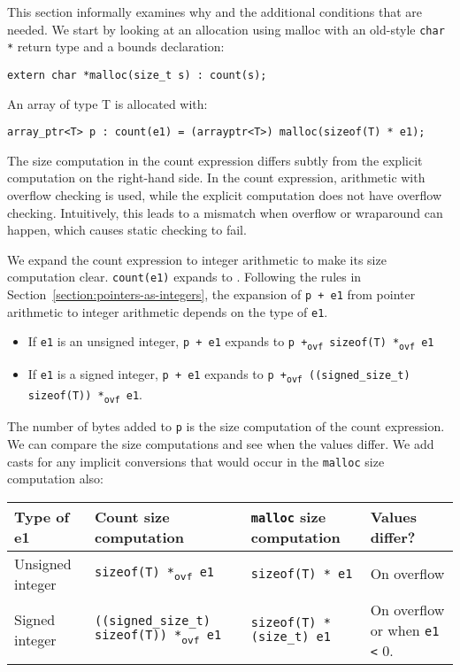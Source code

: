 This section informally examines why and the additional conditions that
are needed. We start by looking at an allocation using malloc with an
old-style \texttt{char *} return type and a bounds declaration:

\begin{verbatim}
extern char *malloc(size_t s) : count(s);
\end{verbatim}

An array of type T is allocated with:

\begin{verbatim}
array_ptr<T> p : count(e1) = (arrayptr<T>) malloc(sizeof(T) * e1);
\end{verbatim}

The size computation in the count expression differs subtly from the
explicit computation on the right-hand side. In the count expression,
arithmetic with overflow checking is used, while the explicit
computation does not have overflow checking. Intuitively, this leads to
a mismatch when overflow or wraparound can happen, which causes static
checking to fail.

We expand the count expression to integer arithmetic to make its size
computation clear. \texttt{count(e1)} expands to . 
Following the rules in Section~\ref{section:pointers-as-integers},
the expansion of \texttt{p +
e1} from pointer arithmetic to integer arithmetic depends on the type of
\texttt{e1}.

\begin{itemize}
\item
  If \texttt{e1} is an unsigned integer, \texttt{p + e1} expands to
  \texttt{p +\textsubscript{ovf} sizeof(T) *\textsubscript{ovf} e1}
\item
  If \texttt{e1} is a signed integer, \texttt{p + e1} expands to
  \texttt{p +\textsubscript{ovf} ((signed\_size\_t) sizeof(T))
  *\textsubscript{ovf} e1}.
\end{itemize}

The number of bytes added to \texttt{p} is the size computation of the
count expression. We can compare the size computations and see when the
values differ. We add casts for any implicit conversions that would
occur in the \texttt{malloc} size computation also:

\begin{longtable}[c]{lp{1.75in}p{1.75in}p{1in}}
\toprule
Type of e1 & Count size computation & \texttt{malloc} size computation &
Values differ?\tabularnewline
\midrule
\endhead
Unsigned integer & \texttt{sizeof(T) *\textsubscript{ovf} e1} &
\texttt{sizeof(T) * e1} & On overflow\tabularnewline
Signed integer & \texttt{((signed\_size\_t) sizeof(T))
*\textsubscript{ovf} e1} & \texttt{sizeof(T) * (size\_t) e1} & On
overflow or when \texttt{e1 <} 0.\tabularnewline
\bottomrule
\end{longtable}

